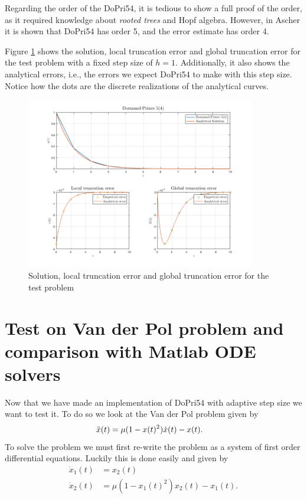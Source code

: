 Regarding the order of the DoPri54, it is tedious to show a full proof of the order, as it required knowledge about \textit{rooted trees} and Hopf algebra. However, in Ascher\cite{Ascher} it is shown that DoPri54 has order 5, and the error estimate has order 4. 

Figure \ref{fig6:test_problem} shows the solution, local truncation error and global truncation error for the test problem with a fixed step size of $h=1$. Additionally, it also shows the analytical errors, i.e., the errors we expect DoPri54 to make with this step size. Notice how the dots are the discrete realizations of the analytical curves. 

\begin{figure}[H]
    \centering
    \includegraphics[width=10cm]{graphics/opg6/test_problem.png}
    \caption{Solution, local truncation error and global truncation error for the test problem}
    \label{fig6:test_problem}
\end{figure}



\section{Test on Van der Pol problem and comparison with Matlab ODE solvers}
Now that we have made an implementation of DoPri54 with adaptive step size we want to test it. To do so we look at the Van der Pol problem given by
\begin{align}
    \Ddot{x}(t) &= \mu (1-x(t)^2) \dot{x}(t) - x(t).
\end{align}
To solve the problem we must first re-write the problem as a system of first order differential equations. Luckily this is done easily and given by
\begin{align}
    \dot{x}_1(t) &= x_2(t) \\
    \dot{x}_2(t) &= \mu(1-x_1(t)^2) x_2(t) - x_1(t).
\end{align}

